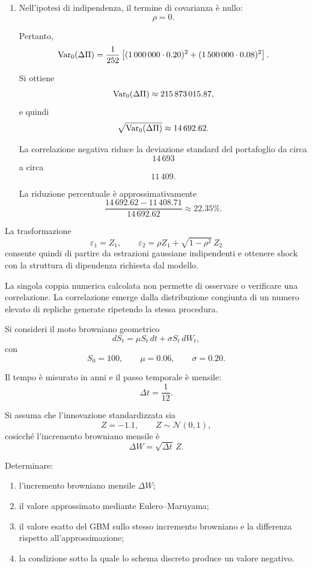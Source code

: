 \begin{enumerate}
La deviazione standard giornaliera \`{e} quindi
\[
\sqrt{\Var(\Delta\Pi)}
\approx
11\,408.71.
\]

\item Nell'ipotesi di indipendenza, il termine di covarianza \`{e} nullo:
\[
\rho=0.
\]

Pertanto,
\[
\operatorname{Var}_0(\Delta\Pi)
=
\frac{1}{252}
\left[
(1\,000\,000\cdot0.20)^2
+
(1\,500\,000\cdot0.08)^2
\right].
\]

Si ottiene
\[
\operatorname{Var}_0(\Delta\Pi)
\approx
215\,873\,015.87,
\]
e quindi
\[
\sqrt{\operatorname{Var}_0(\Delta\Pi)}
\approx
14\,692.62.
\]

La correlazione negativa riduce la deviazione standard del portafoglio
da circa
\[
14\,693
\]
a circa
\[
11\,409.
\]

La riduzione percentuale \`{e} approssimativamente
\[
\frac{14\,692.62-11\,408.71}{14\,692.62}
\approx
22.35\%.
\]

\end{enumerate}

\noindent La trasformazione
\[
\varepsilon_1=Z_1,
\qquad
\varepsilon_2
=
\rho Z_1+\sqrt{1-\rho^2}\,Z_2
\]
consente quindi di partire da estrazioni gaussiane indipendenti e ottenere
shock con la struttura di dipendenza richiesta dal modello.

La singola coppia numerica calcolata non permette di osservare o
verificare una correlazione. La correlazione emerge dalla distribuzione
congiunta di un numero elevato di repliche generate ripetendo la stessa
procedura.

\begin{exercise}
\label{ex:cap06-eulero-maruyama-gbm}

Si consideri il moto browniano geometrico
\[
dS_t
=
\mu S_t\,dt+\sigma S_t\,dW_t,
\]
con
\[
S_0=100,
\qquad
\mu=0.06,
\qquad
\sigma=0.20.
\]

Il tempo \`{e} misurato in anni e il passo temporale \`{e} mensile:
\[
\Delta t=\frac{1}{12}.
\]

Si assuma che l'innovazione standardizzata sia
\[
Z=-1.1,
\qquad
Z\sim\mathcal{N}(0,1),
\]
cosicch\'{e} l'incremento browniano mensile \`{e}
\[
\Delta W=\sqrt{\Delta t}\,Z.
\]

Determinare:

\begin{enumerate}
\item l'incremento browniano mensile $\Delta W$;
\item il valore approssimato mediante Eulero--Maruyama;
\item il valore esatto del GBM sullo stesso incremento browniano e la
differenza rispetto all'approssimazione;
\item la condizione sotto la quale lo schema discreto produce un valore
negativo.
\end{enumerate}

\end{exercise}

